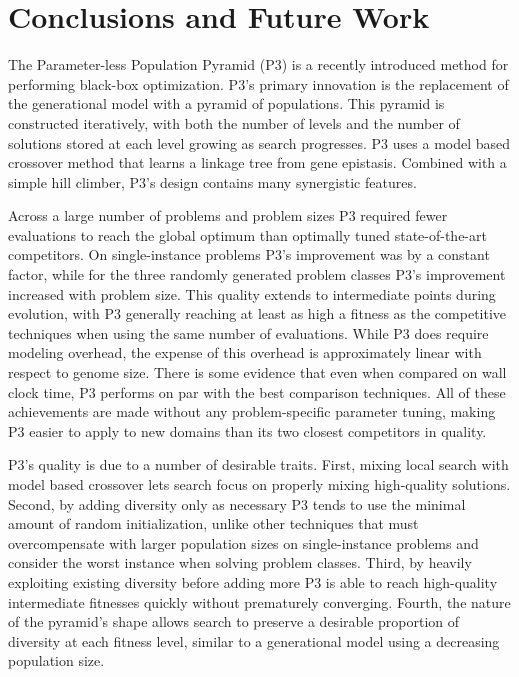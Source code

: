 \chapter{Conclusions and Future Work}
The Parameter-less Population Pyramid (P3) is a recently introduced method for performing black-box
optimization. P3's primary innovation is the replacement of the generational model with a pyramid of populations.
This pyramid is constructed iteratively, with both the number of levels and the number of solutions stored
at each level growing as search progresses. P3 uses a model based crossover method
that learns a linkage tree from gene epistasis. Combined with a simple hill climber, P3's design contains
many synergistic features.

Across a large number of problems and problem sizes P3 required fewer evaluations to reach the global optimum
than optimally tuned state-of-the-art competitors. On single-instance problems P3's improvement was by a
constant factor, while for the three randomly generated problem classes P3's improvement increased with problem size. This
quality extends to intermediate points during evolution, with P3 generally reaching at least as high
a fitness as the competitive techniques when using the same number of evaluations. While P3 does require
modeling overhead, the expense of this overhead is approximately linear with respect to genome size. There
is some evidence that even when compared on wall clock time, P3 performs on par with
the best comparison techniques. All of these achievements are made without any problem-specific parameter
tuning, making P3 easier to apply to new domains than its two closest competitors in quality.

P3's quality is due to a number of desirable traits. First, mixing local search with model based
crossover lets search focus on properly mixing high-quality solutions. Second, by adding diversity only
as necessary P3 tends to use the minimal amount of random initialization, unlike other techniques that must
overcompensate with larger population sizes on single-instance problems and consider the worst instance
when solving problem classes. Third, by heavily exploiting existing diversity before adding more P3 is able
to reach high-quality intermediate fitnesses quickly without prematurely converging. Fourth, the
nature of the pyramid's shape allows search to preserve a desirable proportion of diversity at
each fitness level, similar to a generational model using a decreasing population size.

